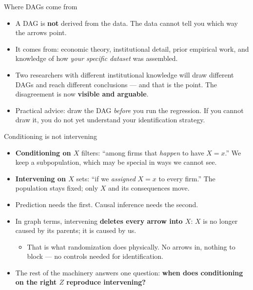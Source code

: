 \documentclass[
  11pt,
  ignorenonframetext,
  aspectratio=169,
]{beamer}
\providecommand{\tightlist}{%
  \setlength{\itemsep}{0pt}\setlength{\parskip}{0pt}}
\begin{document}
\begin{frame}{Where DAGs come from}
\protect{}\label{where-dags-come-from}
\begin{itemize}
\tightlist
\item
  A DAG is \textbf{not} derived from the data. The data cannot tell you
  which way the arrows point.
\item
  It comes from: economic theory, institutional detail, prior empirical
  work, and knowledge of how \emph{your specific dataset} was assembled.
\item
  Two researchers with different institutional knowledge will draw
  different DAGs and reach different conclusions --- and that is the
  point. The disagreement is now \textbf{visible and arguable}.
\item
  Practical advice: draw the DAG \emph{before} you run the regression.
  If you cannot draw it, you do not yet understand your identification
  strategy.
\end{itemize}
\end{frame}

\begin{frame}{Conditioning is not intervening}
\protect{}\label{conditioning-is-not-intervening}
\begin{itemize}
\tightlist
\item
  \textbf{Conditioning on \(X\)} filters: ``among firms that
  \emph{happen} to have \(X = x\).'' We keep a subpopulation, which may
  be special in ways we cannot see.
\item
  \textbf{Intervening on \(X\)} sets: ``if we \emph{assigned} \(X = x\)
  to every firm.'' The population stays fixed; only \(X\) and its
  consequences move.
\item
  Prediction needs the first. Causal inference needs the second.
\item
  In graph terms, intervening \textbf{deletes every arrow into \(X\)}:
  \(X\) is no longer caused by its parents; it is caused by us.

  \begin{itemize}
  \tightlist
  \item
    That is what randomization does physically. No arrows in, nothing to
    block --- no controls needed for identification.
  \end{itemize}
\item
  The rest of the machinery answers one question: \textbf{when does
  conditioning on the right \(Z\) reproduce intervening?}
\end{itemize}
\end{frame}
\end{document}
